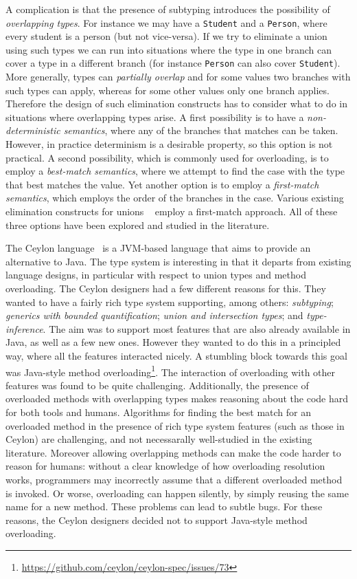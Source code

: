 A complication is that the presence of subtyping introduces the
possibility of \emph{overlapping types}. For instance we may have a
\lstinline{Student} and a \lstinline{Person}, where every student is a person (but not
vice-versa). If we try to eliminate a union using such types we can
run into situations where the type in one branch can cover a type in a
different branch (for instance \lstinline{Person} can also cover
\lstinline{Student}). More generally, types can \emph{partially overlap}
and for some values two branches with such types can apply, whereas
for some other values only one branch applies.
Therefore the design of such elimination constructs has to
consider what to do in situations where overlapping types arise.  A
first possibility is to have a \emph{non-deterministic semantics},
where any of the branches that matches can be taken. However, in
practice determinism is a desirable property,
so this option is not practical. A second possibility, which is
commonly used for overloading, is to employ a \emph{best-match
  semantics}, where we attempt to find the case with the type that
best matches the value. Yet another option is to employ a
\emph{first-match semantics}, which employs the order of the branches
in the case. Various existing elimination constructs for unions
~\cite{benzaken2003cduce,castagna:settheoretic}
employ a first-match approach. All of these three options have been explored
and studied in the literature. 

The Ceylon language~\cite{king2013ceylon} is a JVM-based language that aims to provide an
alternative to Java. The type system is interesting
in that it departs from existing language designs, in particular
with respect to union types and method overloading.
The Ceylon designers had a few different
reasons for this. They wanted to have a fairly rich type system
supporting, among others: \emph{subtyping}; \emph{generics with bounded
quantification}; \emph{union and intersection types}; and \emph{type-inference}.
The aim was to support most features that are also already available
in Java, as well as a few new ones. However they wanted to do this in
a principled way, where all the features interacted nicely.  A
stumbling block towards this goal was Java-style method
overloading\footnote{\url{https://github.com/ceylon/ceylon-spec/issues/73}}.
The interaction of overloading with other
features was found to be quite challenging. Additionally, the presence of
overloaded methods with overlapping types
makes reasoning about the code hard 
for both tools and humans. Algorithms for finding the best match for an
overloaded method in the presence of rich type system features (such as
those in Ceylon) are challenging, and not necessarally well-studied in the
existing literature. Moreover allowing overlapping methods can make
the code harder to reason for humans: without a clear knowledge of how
overloading resolution works, programmers may incorrectly assume that
a different overloaded method is invoked. Or worse, overloading can
happen silently, by simply reusing the same name for a new
method. These problems can lead to subtle bugs.
For these reasons, the Ceylon designers decided not to support
Java-style method overloading.

